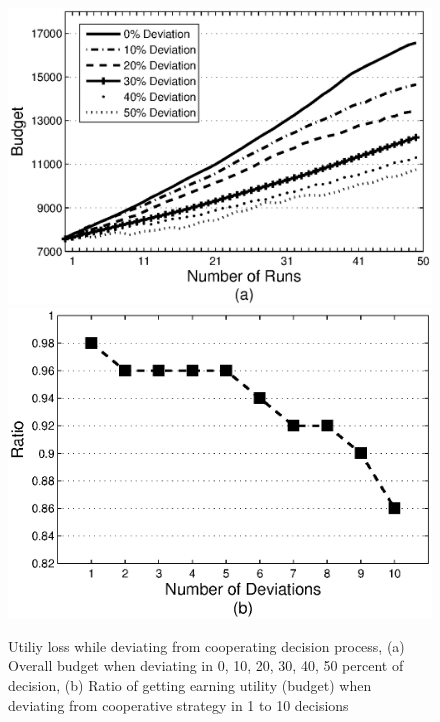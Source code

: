 \documentclass[runningheads,a4paper]{llncs}
\begin{document}
\begin{figure}%
\centering
\includegraphics[scale=0.4]{graphdev.eps}
\includegraphics[scale=0.4]{graphdev2.eps}
\caption{Utiliy loss while deviating from cooperating decision process, (a) Overall budget when deviating in 0, 10, 20, 30, 40, 50 percent of decision, (b) Ratio of getting earning utility (budget) when deviating from cooperative strategy in 1 to 10 decisions} \label{graph_dev}
\end{figure}

\end{document}

